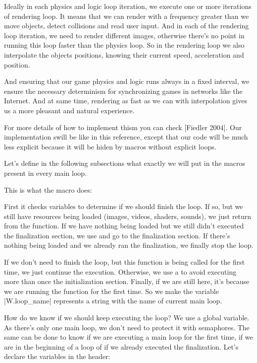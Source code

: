 Ideally in each physics and logic loop iteration, we execute one or
more iterations of rendering loop. It means that we can render with a
frequency greater than we move objects, detect collisions and read
user input. And in each of the rendering loop iteration, we need to
render different images, otherwise there's no point in running this
loop faster than the physics loop. So in the rendering loop we also
interpolate the objects positions, knowing their current speed,
acceleration and position.

And ensuring that our game physics and logic runs always in a fixed
interval, we ensure the necessary determinism for synchronizing games
in networks like the Internet. And at same time, rendering as fast as
we can with interpolation gives us a more pleasant and natural
experience.

For more details of how to implement thism you can check [Fiedler
2004]. Our implementation swill be like in this reference, except that
our code will be much less explicit because it will be hiden by macros
without explicit loops.

Let's define in the following subsections what exactly we will put in
the macros present in every main loop.


This is what the macro  does:

First it checks variables to determine if we should finish the
loop. If so, but we still have resources being loaded (images, videos,
shaders, sounds), we just return from the function. If we have nothing
being loaded but we still didn't executed the finalization section, we
use  and go to the finalization section. If there's
nothing being loaded and we already ran the finalization, we finally
stop the loop.

If we don't need to finish the loop, but this function is being called
for the first time, we just continue the execution. Otherwise, we use
a  to avoid executing more than once the
initialization section. Finally, if we are still here, it's because we
are running the function for the first time. So we make the variable
|W.loop_name| represents a string with the name of current main loop.

How do we know if we should keep executing the loop? We use a global
variable. As there's only one main loop, we don't need to protect it
with semaphores. The same can be done to know if we are executing a
main loop for the first time, if we are in the beginning of a loop of
if we already executed the finalization. Let's declare the variables
in the header:


